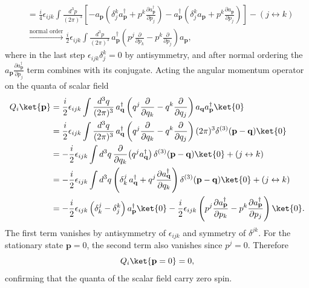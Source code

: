 \begin{solution}
\begin{equation}
\begin{aligned}
        &= \frac{i}{4}\epsilon_{ijk}\int\frac{d^3p}{(2\pi)^3}\left[-a_\mathbf{p}\left(\delta^k_j a^\dagger_\mathbf{p}+ p^k\frac{\partial a^\dagger_\mathbf{p}}{\partial p_j}\right) - a^\dagger_\mathbf{p}\left(\delta^k_j a_\mathbf{p} + p^k\frac{\partial a_\mathbf{p}}{\partial p_j}\right)\right] - (j\leftrightarrow k)\\
        &\xrightarrow{\text{normal order}} \frac{i}{2}\epsilon_{ijk}\int\frac{d^3p}{(2\pi)^3}\, a^\dagger_\mathbf{p}\left(p^j\frac{\partial}{\partial p_k} - p^k\frac{\partial}{\partial p_j}\right)a_\mathbf{p},
    \end{aligned}
    \end{equation}
    where in the last step $\epsilon_{ijk}\delta^k_j = 0$ by antisymmetry, and after normal ordering the $a_\mathbf{p}\frac{\partial a^\dagger_\mathbf{p}}{\partial p_j}$ term combines with its conjugate.
    Acting the angular momentum operator on the quanta of scalar field
    \begin{equation}
    \begin{aligned}
        Q_i\ket{\mathbf{p}} &= \frac{i}{2}\epsilon_{ijk}\int\frac{d^3q}{(2\pi)^3}\, a^\dagger_\mathbf{q}\left(q^j\frac{\partial}{\partial q_k} - q^k\frac{\partial}{\partial q_j}\right)a_\mathbf{q}a_\mathbf{p}^\dagger\ket{0}\\
        &=\frac{i}{2}\epsilon_{ijk}\int\frac{d^3q}{(2\pi)^3}\, a^\dagger_\mathbf{q}\left(q^j\frac{\partial}{\partial q_k} - q^k\frac{\partial}{\partial q_j}\right)(2\pi)^3\delta^{(3)}(\mathbf{p}-\mathbf{q})\ket{0}\\
        &= -\frac{i}{2}\epsilon_{ijk}\int d^3q\,\frac{\partial}{\partial q_k}\!\left(q^j a^\dagger_\mathbf{q}\right)\delta^{(3)}(\mathbf{p}-\mathbf{q})\ket{0} + (j\leftrightarrow k)\\
        &= -\frac{i}{2}\epsilon_{ijk}\int d^3q\left(\delta^j_k\, a^\dagger_\mathbf{q} + q^j\frac{\partial a^\dagger_\mathbf{q}}{\partial q_k}\right)\delta^{(3)}(\mathbf{p}-\mathbf{q})\ket{0} + (j\leftrightarrow k)\\
        &= -\frac{i}{2}\epsilon_{ijk}\left(\delta^j_k - \delta^k_j\right)a^\dagger_\mathbf{p}\ket{0} - \frac{i}{2}\epsilon_{ijk}\left(p^j\frac{\partial a^\dagger_\mathbf{p}}{\partial p_k} - p^k\frac{\partial a^\dagger_\mathbf{p}}{\partial p_j}\right)\ket{0}.
    \end{aligned}
    \end{equation}
    The first term vanishes by antisymmetry of $\epsilon_{ijk}$ and symmetry of $\delta^{jk}$. For the stationary state $\mathbf{p} = 0$, the second term also vanishes since $p^j = 0$. Therefore
    \begin{equation}
        Q_i\ket{\mathbf{p}=0} = 0,
    \end{equation}
    confirming that the quanta of the scalar field carry zero spin.
\end{solution}

